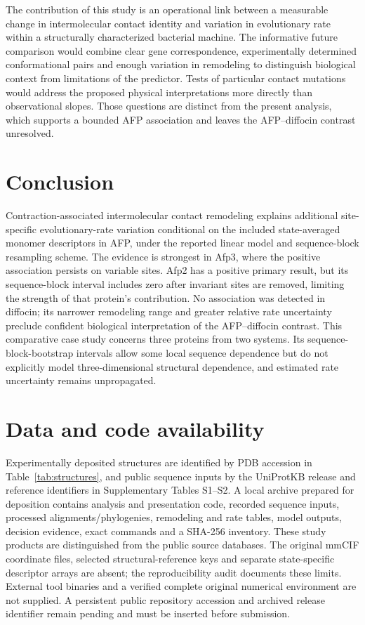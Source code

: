 \documentclass[11pt,a4paper]{article}
\begin{document}
The contribution of this study is an operational link between a measurable change in intermolecular contact identity and variation in evolutionary rate within a structurally characterized bacterial machine. The informative future comparison would combine clear gene correspondence, experimentally determined conformational pairs and enough variation in remodeling to distinguish biological context from limitations of the predictor. Tests of particular contact mutations would address the proposed physical interpretations more directly than observational slopes. Those questions are distinct from the present analysis, which supports a bounded AFP association and leaves the AFP--diffocin contrast unresolved.

\section{Conclusion}

Contraction-associated intermolecular contact remodeling explains additional site-specific evolutionary-rate variation conditional on the included state-averaged monomer descriptors in AFP, under the reported linear model and sequence-block resampling scheme. The evidence is strongest in Afp3, where the positive association persists on variable sites. Afp2 has a positive primary result, but its sequence-block interval includes zero after invariant sites are removed, limiting the strength of that protein's contribution. No association was detected in diffocin; its narrower remodeling range and greater relative rate uncertainty preclude confident biological interpretation of the AFP--diffocin contrast. This comparative case study concerns three proteins from two systems. Its sequence-block-bootstrap intervals allow some local sequence dependence but do not explicitly model three-dimensional structural dependence, and estimated rate uncertainty remains unpropagated.

\section*{Data and code availability}

Experimentally deposited structures are identified by PDB accession in Table~\ref{tab:structures}, and public sequence inputs by the UniProtKB release and reference identifiers in Supplementary Tables S1--S2. A local archive prepared for deposition contains analysis and presentation code, recorded sequence inputs, processed alignments/phylogenies, remodeling and rate tables, model outputs, decision evidence, exact commands and a SHA-256 inventory. These study products are distinguished from the public source databases. The original mmCIF coordinate files, selected structural-reference keys and separate state-specific descriptor arrays are absent; the reproducibility audit documents these limits. External tool binaries and a verified complete original numerical environment are not supplied. A persistent public repository accession and archived release identifier remain pending and must be inserted before submission.
\end{document}
